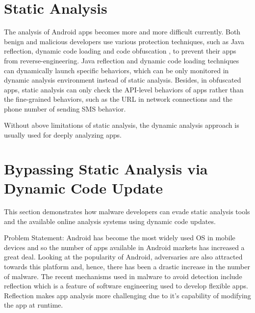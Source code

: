 \section{Static Analysis}

The analysis of Android apps becomes more and more difficult currently. Both benign and malicious developers use various protection techniques, such as Java reflection, dynamic code loading and code obfuscation \cite{rastogi2013droidchameleon}, to prevent their apps from reverse-engineering. Java reflection and dynamic code loading techniques can dynamically launch specific behaviors, which can be only monitored in dynamic analysis environment instead of static analysis. Besides, in obfuscated apps, static analysis can only check the API-level behaviors of apps rather than the fine-grained behaviors, such as the URL in network connections and the phone number of sending SMS behavior.

Without above limitations of static analysis, the dynamic analysis approach is usually used for deeply analyzing apps.

\section{Bypassing Static Analysis via Dynamic Code Update}
\label{sec:refbench_dcl}

This section demonstrates how malware developers can evade static analysis tools and the available online analysis systems using dynamic code updates. %

\iffalse
Problem Statement: Android has become the most widely used OS in mobile devices and so the number of apps available in Android markets has increased a great deal. Looking at the popularity of Android, adversaries are also attracted towards this platform and, hence, there has been a drastic increase in the number of malware. The recent mechanisms used in malware to avoid detection include reflection which is a feature of software engineering used to develop flexible apps. Reflection makes app analysis more challenging due to it's capability of modifying the app at runtime. 

